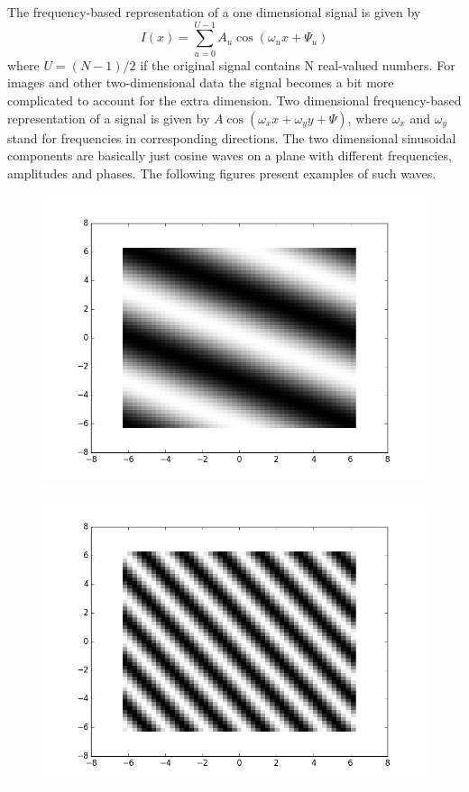 \documentclass[]{article}
\begin{document}
The frequency-based representation of a one dimensional signal is given by
\begin{equation}
  I(x) = \sum_{u=0}^{U-1}{A_{u}\cos(\omega_{u}x+\Psi_{u})}
\end{equation}
where $U = (N-1)/2$ if the original signal contains N real-valued numbers. For
images and other two-dimensional data the signal becomes a bit more complicated
to account for the extra dimension. Two dimensional frequency-based
representation of a signal is given by $A \cos(\omega_{x} x + \omega_{y} y +
\Psi)$, where $\omega_{x}$ and $\omega_{y}$ stand for frequencies in
corresponding directions. The two dimensional sinusoidal components are
basically just cosine waves on a plane with different frequencies, amplitudes
and phases. The following figures present examples of such waves.
\begin{figure}
    \includegraphics{sinusoidal1.png}
\end{figure}
\begin{figure}
    \includegraphics{sinusoidal2.png}
\end{figure}
\end{document}
